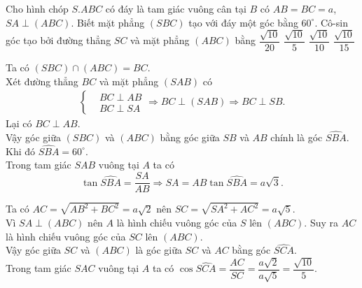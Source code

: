 \begin{ex}%
 Cho hình chóp $S.ABC$ có đáy là tam giác vuông cân tại $B$ có $AB=BC=a$, $SA\perp (ABC)$. Biết mặt phẳng $(SBC)$ tạo với đáy một góc bằng $60^\circ$. Cô-sin góc tạo bởi đường thẳng $SC$ và mặt phẳng $(ABC)$ bằng
 \choice
  {$\dfrac{\sqrt{10}}{20}$}
  {\True $\dfrac{\sqrt{10}}{5}$}
  {$\dfrac{\sqrt{10}}{10}$}
  {$\dfrac{\sqrt{10}}{15}$}
 \loigiai
  {
  \immini
  {
  Ta có $(SBC) \cap (ABC) = BC$.\\
  Xét đường thẳng $BC$ và mặt phẳng $(SAB)$ có
  \begin{eqnarray*}
   \left\{\begin{aligned} & BC \perp AB \\& BC \perp SA \end{aligned}\right. \Rightarrow BC \perp (SAB) \Rightarrow BC \perp SB.
  \end{eqnarray*}
  Lại có $BC \perp AB$.\\
  Vậy góc giữa $(SBC)$ và $(ABC)$ bằng góc giữa $SB$ và $AB$ chính là góc $\widehat{SBA}$. Khi đó $\widehat{SBA}=60^\circ$.\\
  Trong tam giác $SAB$ vuông tại $A$ ta có
  $$\tan \widehat{SBA} = \dfrac{SA}{AB} \Rightarrow SA = AB \tan \widehat{SBA} = a\sqrt{3}.$$
  }
  {
  }
  \noindent
  Ta có $AC = \sqrt{AB^2 + BC^2} = a\sqrt{2}$ nên $SC = \sqrt{SA^2 + AC^2} = a\sqrt{5}$.\\
  Vì $SA \perp (ABC)$ nên $A$ là hình chiếu vuông góc của $S$ lên $(ABC)$. Suy ra $AC$ là hình chiếu vuông góc của $SC$ lên $(ABC)$.\\
  Vậy góc giữa $SC$ và $(ABC)$ là góc giữa $SC$ và $AC$ bằng góc $\widehat{SCA}$.\\
  Trong tam giác $SAC$ vuông tại $A$ ta có $\cos \widehat{SCA} = \dfrac{AC}{SC} = \dfrac{a\sqrt{2}}{a\sqrt{5}} = \dfrac{\sqrt{10}}{5}$.
  }
\end{ex}


